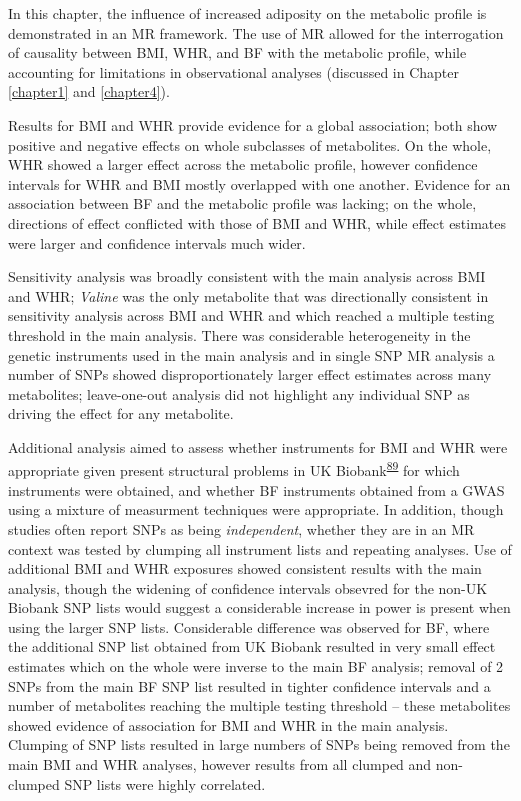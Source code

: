 \documentclass[11pt,twoside]{bristolthesis}
\begin{document}
In this chapter, the influence of increased adiposity on the metabolic profile is demonstrated in an MR framework. The use of MR allowed for the interrogation of causality between BMI, WHR, and BF with the metabolic profile, while accounting for limitations in observational analyses (discussed in Chapter \ref{chapter1} and \ref{chapter4}).

Results for BMI and WHR provide evidence for a global association; both show positive and negative effects on whole subclasses of metabolites. On the whole, WHR showed a larger effect across the metabolic profile, however confidence intervals for WHR and BMI mostly overlapped with one another. Evidence for an association between BF and the metabolic profile was lacking; on the whole, directions of effect conflicted with those of BMI and WHR, while effect estimates were larger and confidence intervals much wider.

Sensitivity analysis was broadly consistent with the main analysis across BMI and WHR; \emph{Valine} was the only metabolite that was directionally consistent in sensitivity analysis across BMI and WHR and which reached a multiple testing threshold in the main analysis. There was considerable heterogeneity in the genetic instruments used in the main analysis and in single SNP MR analysis a number of SNPs showed disproportionately larger effect estimates across many metabolites; leave-one-out analysis did not highlight any individual SNP as driving the effect for any metabolite.

Additional analysis aimed to assess whether instruments for BMI and WHR were appropriate given present structural problems in UK Biobank\textsuperscript{\protect\hyperlink{ref-Haworth2019}{89}} for which instruments were obtained, and whether BF instruments obtained from a GWAS using a mixture of measurment techniques were appropriate. In addition, though studies often report SNPs as being \emph{independent}, whether they are in an MR context was tested by clumping all instrument lists and repeating analyses. Use of additional BMI and WHR exposures showed consistent results with the main analysis, though the widening of confidence intervals obsevred for the non-UK Biobank SNP lists would suggest a considerable increase in power is present when using the larger SNP lists. Considerable difference was observed for BF, where the additional SNP list obtained from UK Biobank resulted in very small effect estimates which on the whole were inverse to the main BF analysis; removal of 2 SNPs from the main BF SNP list resulted in tighter confidence intervals and a number of metabolites reaching the multiple testing threshold -- these metabolites showed evidence of association for BMI and WHR in the main analysis. Clumping of SNP lists resulted in large numbers of SNPs being removed from the main BMI and WHR analyses, however results from all clumped and non-clumped SNP lists were highly correlated.
\end{document}
